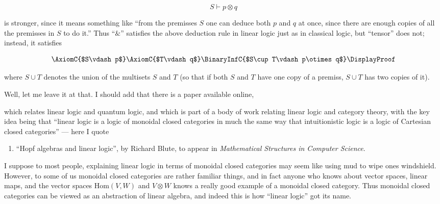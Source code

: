 \documentclass{article}
\def\tightlist{}
\renewcommand{\texttt}[1]{%
  \begingroup
  \ttfamily
  \begingroup\lccode`~=`/\lowercase{\endgroup\def~}{/\discretionary{}{}{}}%
  \begingroup\lccode`~=`[\lowercase{\endgroup\def~}{[\discretionary{}{}{}}%
  \begingroup\lccode`~=`.\lowercase{\endgroup\def~}{.\discretionary{}{}{}}%
  \catcode`/=\active\catcode`[=\active\catcode`.=\active
  \scantokens{#1\noexpand}%
  \endgroup
}
\begin{document}
\[S\vdash p\otimes q\]

is stronger, since it means something like ``from the premisses \(S\)
one can deduce both \(p\) and \(q\) at once, since there are enough
copies of all the premisses in \(S\) to do it.'' Thus ``\(\&\)''
satisfies the above deduction rule in linear logic just as in classical
logic, but ``tensor'' does not; instead, it satisfies

\[\AxiomC{$S\vdash p$}\AxiomC{$T\vdash q$}\BinaryInfC{$S\cup T\vdash p\otimes q$}\DisplayProof\]

where \(S \cup T\) denotes the union of the multisets \(S\) and \(T\)
(so that if both \(S\) and \(T\) have one copy of a premiss,
\(S \cup T\) has two copies of it).

Well, let me leave it at that. I should add that there is a paper
available online,


which relates linear logic and quantum logic, and which is part of a
body of work relating linear logic and category theory, with the key
idea being that ``linear logic is a logic of monoidal closed categories
in much the same way that intuitionistic logic is a logic of Cartesian
closed categories'' --- here I quote

\begin{enumerate}
\def\labelenumi{\arabic{enumi})}
\setcounter{enumi}{2}
\tightlist
\item
  ``Hopf algebras and linear logic'', by Richard Blute, to appear in
  \emph{Mathematical Structures in Computer Science}.
\end{enumerate}

I suppose to most people, explaining linear logic in terms of monoidal
closed categories may seem like using mud to wipe ones windshield.
However, to some of us monoidal closed categories are rather familiar
things, and in fact anyone who knows about vector spaces, linear maps,
and the vector spaces \(\mathrm{Hom}(V,W)\) and \(V\otimes W\) knows a
really good example of a monoidal closed category. Thus monoidal closed
categories can be viewed as an abstraction of linear algebra, and indeed
this is how ``linear logic'' got its name.
\end{document}
